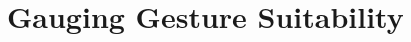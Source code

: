 \documentclass[manuscript, review, screen]{acmart}
\begin{document}




\section{Gauging Gesture Suitability} 
\label{sec:gestures}
\end{document}
